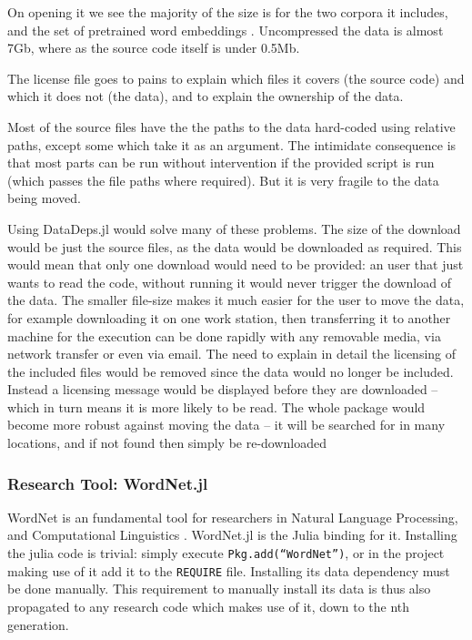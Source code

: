 \documentclass{jors}
\begin{document}
On opening it we see the majority of the size is for the two corpora \parencite{francis1979brown,moviebook} it includes, and the set of pretrained word embeddings \parencite{pennington2014glove}.
Uncompressed the data is almost 7Gb, where as the source code itself is under 0.5Mb.

The license file goes to pains to explain which files it covers (the source code) and which it does not (the data),
and to explain the ownership of the data.

Most of the source files have the the paths to the data hard-coded using relative paths, except some which take it as an argument.
The intimidate consequence is that most parts can be run without intervention if the provided script is run (which passes the file paths where required).
But it is very fragile to the data being moved.

Using DataDeps.jl would solve many of these problems.
The size of the download would be just the source files, as the data would be downloaded as required.
This would mean that only one download would need to be provided: an user that just wants to read the code, without running it would never trigger the download of the data.
The smaller file-size makes it much easier for the user to move the data, for example downloading it on one work station, then transferring it to another machine for the execution can be done rapidly with any removable media, via network transfer or even via email.
The need to explain in detail the licensing of the included files would be removed since the data would no longer be included.
Instead a licensing message would be displayed before they are downloaded -- which in turn means it is more likely to be read.
The whole package would become more robust against moving the data -- it will be searched for in many locations, and if not found then simply be re-downloaded


\subsubsection{Research Tool: WordNet.jl}
WordNet is an fundamental tool for researchers in Natural Language Processing, and Computational Linguistics \parencite{miller1995wordnet}.
WordNet.jl is the Julia binding for it.
Installing the julia code is trivial: simply execute \texttt{Pkg.add(``WordNet'')}, or in the project making use of it add it to the \texttt{REQUIRE} file.
Installing its data dependency must be done manually.
This requirement to manually install its data is thus also propagated to any research code which makes use of it, down to the nth generation.
\end{document}
